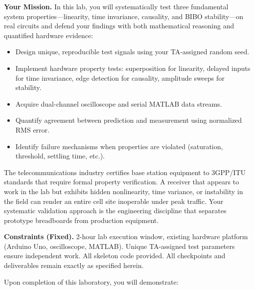 \documentclass[11pt,letterpaper]{article}
\begin{document}
\noindent
\textbf{Your Mission.} In this lab, you will systematically test three fundamental system properties—linearity, time invariance, causality, and BIBO stability—on real circuits and defend your findings with both mathematical reasoning and quantified hardware evidence:
\begin{itemize}
    \item Design unique, reproducible test signals using your TA-assigned random seed.
    \item Implement hardware property tests: superposition for linearity, delayed inputs for time invariance, edge detection for causality, amplitude sweeps for stability.
    \item Acquire dual-channel oscilloscope and serial MATLAB data streams.
    \item Quantify agreement between prediction and measurement using normalized RMS error.
    \item Identify failure mechanisms when properties are violated (saturation, threshold, settling time, etc.).
\end{itemize}

\noindent
The telecommunications industry certifies base station equipment to 3GPP/ITU standards that require formal property verification. A receiver that appears to work in the lab but exhibits hidden nonlinearity, time variance, or instability in the field can render an entire cell site inoperable under peak traffic. Your systematic validation approach is the engineering discipline that separates prototype breadboards from production equipment.

\noindent
\textbf{Constraints (Fixed).} 2-hour lab execution window, existing hardware platform (Arduino Uno, oscilloscope, MATLAB). Unique TA-assigned test parameters ensure independent work. All skeleton code provided. All checkpoints and deliverables remain exactly as specified herein.

\clearpage

Upon completion of this laboratory, you will demonstrate:
\end{document}
